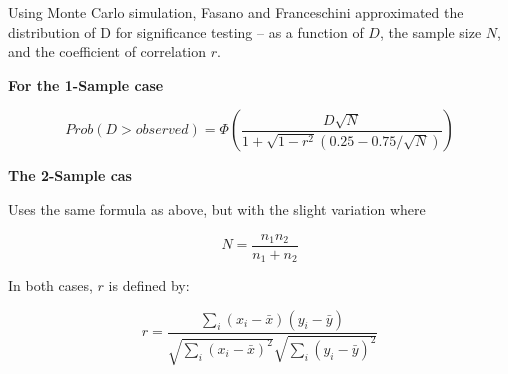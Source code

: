 \documentclass[codesnippet]{jss}
\begin{document}
Using Monte Carlo simulation, Fasano and Franceschini approximated the distribution of D for significance testing -- as a function of $D$, the sample size $N$, and the coefficient of correlation $r$.

\textbf{For the 1-Sample case}

\begin{equation} \label{eq:4}
Prob(D > observed) = \Phi ( \frac{D\sqrt{N}}{1+\sqrt{1-r^2}(0.25-0.75/\sqrt{N})})
\end{equation}

\textbf{The 2-Sample cas}

Uses the same formula as above, but with the slight variation where

\begin{equation} \label{eq:5}
N = \frac{n_1n_2}{n_1+n_2}
\end{equation}

In both cases, $r$ is defined by:

\begin{equation} \label{eq:6}
r = \frac{\sum_{i}^{}(x_i-\bar{x})(y_i-\bar{y})}{\sqrt{\sum_{i}^{}(x_i-\bar{x})^2}\sqrt{\sum_{i}^{}(y_i-\bar{y})^2}}
\end{equation}
\end{document}

